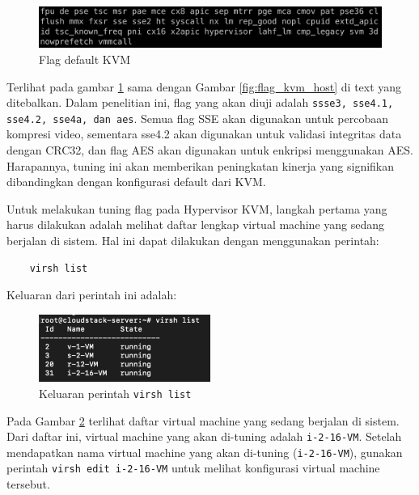 \begin{figure}
    \centering
    \includegraphics[width=1\textwidth]
    {assets/pics/lscpu_original.jpeg}
    \caption{Flag default KVM}
    \label{fig:lscpu_original}
\end{figure}

Terlihat pada gambar \ref{fig:lscpu_original} sama dengan Gambar \ref{fig:flag_kvm_host} di text yang ditebalkan. Dalam penelitian ini, flag yang akan diuji adalah \texttt{ssse3, sse4.1, sse4.2, sse4a, dan aes}. Semua flag SSE akan digunakan untuk percobaan kompresi video, sementara sse4.2 akan digunakan untuk validasi integritas data dengan CRC32, dan flag AES akan digunakan untuk enkripsi menggunakan AES. Harapannya, tuning ini akan memberikan peningkatan kinerja yang signifikan dibandingkan dengan konfigurasi default dari KVM.

Untuk melakukan tuning flag pada Hypervisor KVM, langkah pertama yang harus dilakukan adalah melihat daftar lengkap virtual machine yang sedang berjalan di sistem. Hal ini dapat dilakukan dengan menggunakan perintah:

\begin{lstlisting}
    virsh list
\end{lstlisting}

Keluaran dari perintah ini adalah:
\begin{figure}
    \centering
    \includegraphics[width=0.5\textwidth]
    {assets/pics/virsh_list.png}
    \caption{Keluaran perintah \texttt{virsh list}}
    \label{fig:virsh_list}
\end{figure}

Pada Gambar \ref{fig:virsh_list} terlihat daftar virtual machine yang sedang berjalan di sistem. Dari daftar ini, virtual machine yang akan di-tuning adalah \texttt{i-2-16-VM}. Setelah mendapatkan nama virtual machine yang akan di-tuning (\texttt{i-2-16-VM}), gunakan perintah \texttt{virsh edit i-2-16-VM} untuk melihat konfigurasi virtual machine tersebut.

